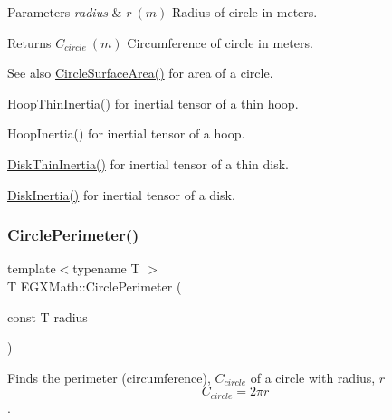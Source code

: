 \begin{DoxyParams}{Parameters}
{\em radius} & $ r\ (m)$ Radius of circle in meters. \\
\hline
\end{DoxyParams}
\begin{DoxyReturn}{Returns}
$ C_{circle}\ (m)$ Circumference of circle in meters. 
\end{DoxyReturn}
\begin{DoxySeeAlso}{See also}
\mbox{\hyperlink{group___e_g_x_math-_geometry-2_d-_circle_gaa4486100a643c57bd7a80c1c11ae3f60}{Circle\+Surface\+Area()}} for area of a circle. 

\mbox{\hyperlink{group___e_g_x_math-_geometry-3_d-_hoop_gab3a84dc2aa29ce0db990425747d291c6}{Hoop\+Thin\+Inertia()}} for inertial tensor of a thin hoop. 

Hoop\+Inertia() for inertial tensor of a hoop. 

\mbox{\hyperlink{group___e_g_x_math-_geometry-3_d-_disk_ga8dcadf6cd5680294a84311c6767e3caf}{Disk\+Thin\+Inertia()}} for inertial tensor of a thin disk. 

\mbox{\hyperlink{group___e_g_x_math-_geometry-3_d-_disk_ga6ed461694b277e36a641a6550bdea68f}{Disk\+Inertia()}} for inertial tensor of a disk. 
\end{DoxySeeAlso}
\mbox{\label{group___e_g_x_math-_geometry-2_d-_circle_gad32d0bded2e74c52a4c41cfffd2a9e77}} 
\subsubsection{\texorpdfstring{Circle\+Perimeter()}{CirclePerimeter()}}
{\footnotesize\ttfamily template$<$typename T $>$ \\
T E\+G\+X\+Math\+::\+Circle\+Perimeter (\begin{DoxyParamCaption}\item[{const T}]{radius }\end{DoxyParamCaption})}



Finds the perimeter (circumference), $C_{circle}$ of a circle with radius, $r$ \[ C_{circle}=2 \pi r \]. 


